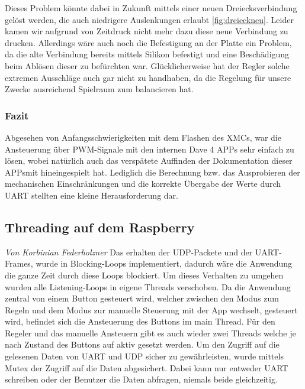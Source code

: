 \documentclass[12pt,a4paper,bibliography=totoc,listof=totoc]{scrartcl}
\begin{document}
Dieses Problem könnte dabei in Zukunft mittels einer neuen Dreiecksverbindung gelöst werden, die auch niedrigere 
Auslenkungen erlaubt \ref {fig:dreieckneu}. Leider kamen wir aufgrund von Zeitdruck nicht mehr dazu diese neue Verbindung zu drucken. 
Allerdings wäre auch noch die Befestigung an der Platte ein Problem, da die alte Verbindung bereits mittels Silikon befestigt und 
eine Beschädigung beim Ablösen dieser zu befürchten war. Glücklicherweise hat der Regler solche extremen Ausschläge auch gar nicht zu 
handhaben, da die Regelung für unsere Zwecke ausreichend Spielraum zum balancieren hat.


\subsubsection{Fazit}
Abgesehen von Anfangsschwierigkeiten mit dem Flashen des XMCs, war die Ansteuerung über PWM-Signale 
mit den internen Dave 4 APPs sehr einfach zu lösen, wobei natürlich auch das verspätete Auffinden der Dokumentation dieser APPsmit hineingespielt hat. 
Lediglich die Berechnung bzw. das Ausprobieren der mechanischen Einschränkungen und die korrekte Übergabe der Werte durch UART stellten eine kleine Herausforderung dar. 

\subsection{Threading auf dem Raspberry}
\textit{Von Korbinian Federholzner}\newline
Das erhalten der UDP-Packete und der UART-Frames, wurde in Blocking-Loops implementiert, dadurch wäre die Anwendung 
die ganze Zeit durch diese Loops blockiert. Um dieses Verhalten zu umgehen wurden alle Listening-Loops in eigene Threads
verschoben. Da die Anwendung zentral von einem Button gesteuert wird, welcher zwischen den Modus zum Regeln und dem 
Modus zur manuelle Steuerung mit der App wechselt, gesteuert wird, befindet sich die Ansteuerung des Buttons im main Thread.
Für den Regeler und das manuelle Ansteuern gibt es auch wieder zwei Threads welche je nach Zustand des Buttons auf 
aktiv gesetzt werden. Um den Zugriff auf die gelesenen Daten von UART und UDP sicher zu gewährleisten, wurde mittels 
Mutex der Zugriff auf die Daten abgesichert. Dabei kann nur entweder UART schreiben oder der Benutzer die Daten abfragen,
niemals beide gleichzeitig.
\end{document}
